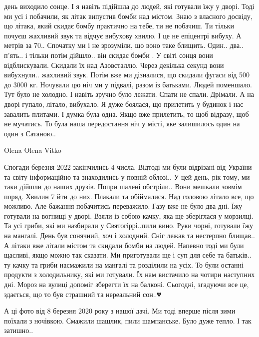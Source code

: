 день виходило сонце. І я навіть підійшла до людей, які готували їжу у дворі.
Тоді ми усі і  побачили, як літак випустив бомби над містом. Знаю з власного
досвіду, що літака, який скидає бомбу практично на тебе, ти не побачиш.  Ти
тільки почуєш жахливий звук та відчує вибухову хвилю. І це не епіцентрі вибуху.
А метрів за 70..   Спочатку ми і не зрозуміли, що воно таке блищить. Один..
два.. п'ять.. і тільки потім дійшло.. він скидає бомби . У світі сонця вони
відблискували.  Скидали їх над Азовсталлю.  Через декілька секунд вони
вибухнули.. жахливий звук. Потім вже ми дізналися, що скидали фугаси від 500 до
3000 кг. Ночували цю ніч ми у підвалі,  разом із  батьками. Людей  поменшало.
Тут було не холодно.  І навіть зручно було лежати. Спати не спали. Дрімали. А
на дворі гупало, літало, вибухало.  Я дуже боялася, що прилетить у будинок і
нас завалить плитами. І думка була одна. Якщо вже прилетить, то щоб відразу,
щоб не мучатись.  То була наша передостання ніч у місті, яке залишилось один на
один з Сатаною..

Olena
Olena Vitko


Спогади березня 2022 закінчились 4 числа. Відтоді ми були відрізані від України
та світу інформаційно та знаходились у повній облозі.. У цей день, рік тому, ми
таки дійшли до наших друзів. Попри шалені обстріли.. Вони мешкали зовмім поряд.
Хвилин 7 йти до них. Плакали та обіймалися.  Над головою літало все, що
можливо. Але бажання побачитись переважило.  Газу вже не було два дні. Їжу
готували на вогнищі у дворі.  Взяли із собою качку, яка ще зберіглася у
морзилці. Та усі гриби, які ми назбирали у Святогіррі..пили вино. Руки чорні,
готували їжу на мангалі.  День був сонячний, хоч і холодний.  Сніг лежав та
нестерпно блищав.. А літаки вже літали містом та скидали бомби на людей.
Напевно тоді ми були щасливі, якщо можно так сказати.  Ми приготували ще і суп
для себе та батьків.. ту качку та гриби насмажили на мангалі та розділили на
усіх. То були останні продукти з холодильнику, які ми готували. Їх нам
вистачило на чотири наступних дні. Мороз на вулиці допоміг зберегти їх на
балконі.  Сьогодні, згадуючи все це, здається, що то був страшний та нереальний
сон..💔

А ці фото від 8 березня  2020 року з нашої дачі. Ми тоді вперше після зими
поїхали з ночівкою. Смажили шашлик, пили шампанське.  Було дуже тепло. І так
затишно..


